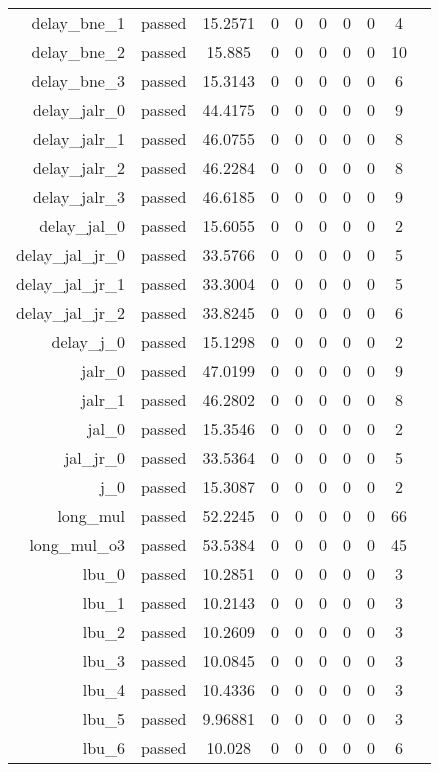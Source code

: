 \begin{longtable}{r|ccccccccc}
    delay\_bne\_1 & passed & 15.2571 & 0 & 0 & 0 & 0 & 0 & 4 \\
    delay\_bne\_2 & passed & 15.885 & 0 & 0 & 0 & 0 & 0 & 10 \\
    delay\_bne\_3 & passed & 15.3143 & 0 & 0 & 0 & 0 & 0 & 6 \\
    delay\_jalr\_0 & passed & 44.4175 & 0 & 0 & 0 & 0 & 0 & 9 \\
    delay\_jalr\_1 & passed & 46.0755 & 0 & 0 & 0 & 0 & 0 & 8 \\
    delay\_jalr\_2 & passed & 46.2284 & 0 & 0 & 0 & 0 & 0 & 8 \\
    delay\_jalr\_3 & passed & 46.6185 & 0 & 0 & 0 & 0 & 0 & 9 \\
    delay\_jal\_0 & passed & 15.6055 & 0 & 0 & 0 & 0 & 0 & 2 \\
    delay\_jal\_jr\_0 & passed & 33.5766 & 0 & 0 & 0 & 0 & 0 & 5 \\
    delay\_jal\_jr\_1 & passed & 33.3004 & 0 & 0 & 0 & 0 & 0 & 5 \\
    delay\_jal\_jr\_2 & passed & 33.8245 & 0 & 0 & 0 & 0 & 0 & 6 \\
    delay\_j\_0 & passed & 15.1298 & 0 & 0 & 0 & 0 & 0 & 2 \\
    jalr\_0 & passed & 47.0199 & 0 & 0 & 0 & 0 & 0 & 9 \\
    jalr\_1 & passed & 46.2802 & 0 & 0 & 0 & 0 & 0 & 8 \\
    jal\_0 & passed & 15.3546 & 0 & 0 & 0 & 0 & 0 & 2 \\
    jal\_jr\_0 & passed & 33.5364 & 0 & 0 & 0 & 0 & 0 & 5 \\
    j\_0 & passed & 15.3087 & 0 & 0 & 0 & 0 & 0 & 2 \\
    long\_mul & passed & 52.2245 & 0 & 0 & 0 & 0 & 0 & 66 \\
    long\_mul\_o3 & passed & 53.5384 & 0 & 0 & 0 & 0 & 0 & 45 \\
    lbu\_0 & passed & 10.2851 & 0 & 0 & 0 & 0 & 0 & 3 \\
    lbu\_1 & passed & 10.2143 & 0 & 0 & 0 & 0 & 0 & 3 \\
    lbu\_2 & passed & 10.2609 & 0 & 0 & 0 & 0 & 0 & 3 \\
    lbu\_3 & passed & 10.0845 & 0 & 0 & 0 & 0 & 0 & 3 \\
    lbu\_4 & passed & 10.4336 & 0 & 0 & 0 & 0 & 0 & 3 \\
    lbu\_5 & passed & 9.96881 & 0 & 0 & 0 & 0 & 0 & 3 \\
    lbu\_6 & passed & 10.028 & 0 & 0 & 0 & 0 & 0 & 6 \\

\end{longtable}
